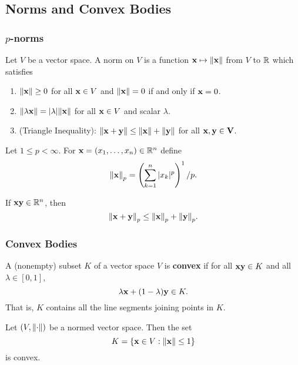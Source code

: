 \subsection{Norms and Convex Bodies}
\subsubsection{\(p\)-norms}
\begin{definition}
    Let \(V\) be a vector space. A norm on \(V\) is a function \({\bf x} \mapsto \norm{\bf x}\) from \(V\) to \(\mathbb{R}\) which satisfies
    \begin{enumerate}
        \item \(\norm{\bf x} \geq 0\) for all \({\bf x} \in V\) and \(\norm{\bf x} = 0\) if and only if \({\bf x} = 0\).
        \item \(\norm{\lambda {\bf x}} = |\lambda|\norm{\bf x}\) for all \({\bf x} \in V\) and scalar \(\lambda\).
        \item (Triangle Inequality): \(\norm{\bf x + y} \leq \norm{\bf x} + \norm{\bf y}\) for all \(\bf{x, y} \in V\).
    \end{enumerate}
\end{definition}

\begin{definition}
    Let \(1 \leq p < \infty\). For \({\bf x} = (x_1, \dots, x_n) \in \mathbb{R}^n\) define
    \[\norm{\bf x}_p = \left(\sum_{k=1}^{n}|x_k|^p \right)^1/p.\]
\end{definition}

\begin{theorem}
    If \({\bf x y} \in \mathbb{R}^n\), then
    \[\norm{\bf x + y}_p \leq \norm{\bf x}_p + \norm{\bf y}_p.\]
\end{theorem}

\subsubsection{Convex Bodies}
\begin{definition}
    A (nonempty) subset \(K\) of a vector space \(V\) is \textbf{convex} if for all \({\bf x y} \in K\) and all \(\lambda \in [0, 1]\),
    \[\lambda {\bf x} + (1 - \lambda) {\bf y} \in K.\]
    That is, \(K\) contains all the line segments joining points in \(K\).
\end{definition}

\begin{proposition}
    Let \((V, \norm{\cdot})\) be a normed vector space. Then the set
    \[K = \{{\bf x} \in V : \norm{\bf x} \leq 1 \}\]
    is convex.
\end{proposition}

